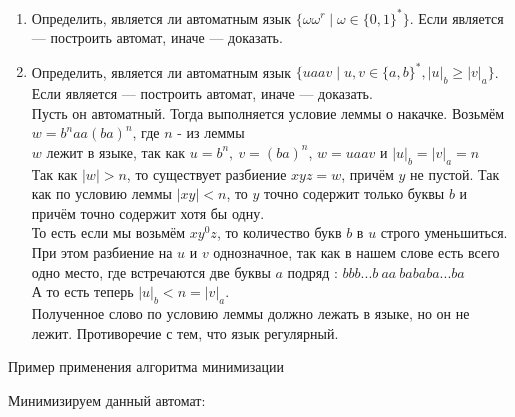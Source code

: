 \documentclass[12pt]{article}
\begin{document}
\begin{enumerate}
  \item Определить, является ли автоматным язык $\{ \omega \omega^r \mid \omega \in \{ 0, 1 \}^* \}$. Если является --- построить автомат, иначе --- доказать.
  
  \item Определить, является ли автоматным язык $\{ u a a v \mid u, v \in \{ a, b \}^* , |u|_b \geq |v|_a \}$. Если является --- построить автомат, иначе --- доказать.
  \\
  Пусть он автоматный. Тогда выполняется условие леммы о накачке. Возьмём $w = b^n a a (b a) ^ n$, где $n$ - из леммы \\
  $w$ лежит в языке, так как $u = b^n , \ v = (ba)^n$, $w = uaav$ и $|u|_b = |v|_a = n$  \\
Так как $|w| > n$, то существует разбиение $xyz = w$, причём $y$ не пустой. Так как по условию леммы $|xy| < n$, то $y$ точно содержит только буквы $b$ и причём точно содержит хотя бы одну. \\
То есть если мы возьмём $xy^0z$, то количество букв $b$ в $u$ строго уменьшиться. При этом разбиение на $u$ и $v$ однозначное, так как в нашем слове есть всего одно место, где встречаются две буквы $a$ подряд : $bbb...b \ aa \ bababa...ba$ \\
А то есть теперь $|u|_b < n = |v|_a$. \\
Полученное слово по условию леммы должно лежать в языке, но он не лежит. Противоречие с тем, что язык регулярный.
  \\
\end{enumerate}

\newpage

\begin{center}
  \Large{Пример применения алгоритма минимизации}
\end{center}

\bigskip

Минимизируем данный автомат:
\end{document}
